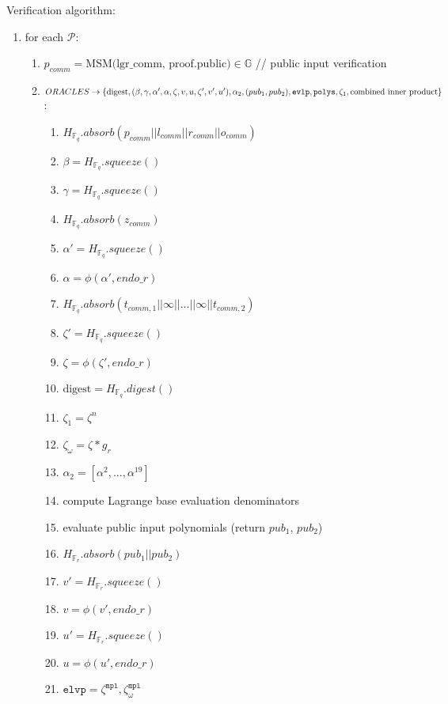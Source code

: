 Verification algorithm:
\begin{enumerate}
	\item for each $\mathcal{P}$:
	\begin{enumerate}
		\item $p_{comm} = \text{MSM(lgr\_comm, proof.public)} \in \mathbb{G}$ // public input verification
		\item $ORACLES \rightarrow \{\text{digest}, 
			(\beta, \gamma, \alpha', \alpha, \zeta, v, u, \zeta', v', u'), \\
			\alpha_2, (pub_1, pub_2), \texttt{evlp}, \texttt{polys}, \zeta_1, \text{combined inner product} \}$:
		\begin{enumerate}
			\item $H_{\mathbb{F}_q}.absorb(p_{comm} || l_{comm} || r_{comm} || o_{comm})$
			\item $\beta = H_{\mathbb{F}_q}.squeeze()$
			\item $\gamma = H_{\mathbb{F}_q}.squeeze()$
			\item $H_{\mathbb{F}_q}.absorb(z_{comm})$
			\item $\alpha' = H_{\mathbb{F}_q}.squeeze()$
			\item $\alpha = \phi(\alpha', endo\_r)$
			\item $H_{\mathbb{F}_q}.absorb(t_{comm, 1} || \infty || ... || \infty || t_{comm, 2})$  %
			\item $\zeta' = H_{\mathbb{F}_q}.squeeze()$
			\item $\zeta = \phi(\zeta', endo\_r)$
			\item $\text{digest} = H_{\mathbb{F}_q}.digest()$
			\item $\zeta_1 = \zeta^n$
			\item $\zeta_{\omega} = \zeta * g_r$
			\item $\alpha_2 = [\alpha^2, ..., \alpha^19]$ %
			\item compute Lagrange base evaluation denominators
			\item evaluate public input polynomials (return $pub_1$, $pub_2$)
			\item $H_{\mathbb{F}_r}.absorb(pub_1 || pub_2)$
			\item $v' = H_{\mathbb{F}_r}.squeeze()$
			\item $v = \phi(v', endo\_r)$
			\item $u' = H_{\mathbb{F}_r}.squeeze()$
			\item $u = \phi(u', endo\_r)$
			\item $\texttt{elvp} = {\zeta^{\texttt{mpl}}, \zeta_{\omega}^{\texttt{mpl}}}$

\end{enumerate}
\end{enumerate}
\end{enumerate}
